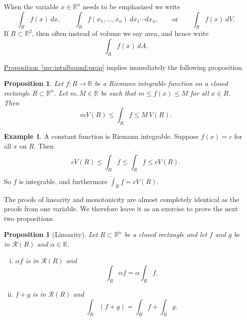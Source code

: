 \documentclass[12pt]{book}
\newcommand{\R}{{\mathbb{R}}}
\newcommand{\sR}{{\mathcal{R}}}
\theoremstyle{plain}
\newtheorem{prop}[thm]{Proposition}
\theoremstyle{remark}
\theoremstyle{definition}
\theoremstyle{exercise}
\theoremstyle{example}
\newtheorem{example}[thm]{Example}
\newcommand{\propref}[1]{\hyperref[#1]{Proposition~\ref*{#1}}}
\begin{document}
When the variable $x \in \R^n$ needs to be emphasized we write
\begin{equation*}
\int_R f(x)~dx,
\qquad
\int_R f(x_1,\ldots,x_n)~dx_1 \cdots dx_n,
\qquad
\text{or}
\qquad
\int_R f(x)~dV .
\end{equation*}
If $R \subset \R^2$, then often instead of volume we say area, and hence
write
\begin{equation*}
\int_R f(x)~dA .
\end{equation*}

\propref{mv:intulbound:prop} implies immediately the following
proposition.

\begin{prop} \label{mv:intbound:prop}
Let $f \colon R \to \R$ be a Riemann integrable function
on a closed rectangle $R \subset \R^n$.
Let $m, M \in \R$ be 
such that $m \leq f(x) \leq M$ for all $x \in R$.  Then
\begin{equation*}
m V(R) \leq
\int_{R} f
\leq M \, V(R) .
\end{equation*}
\end{prop}

\begin{example}
A constant function is Riemann integrable.  Suppose
$f(x) = c$ for all $x$ on $R$.  Then
\begin{equation*}
c V(R) \leq \underline{\int_R} f \leq \overline{\int_R} f \leq cV(R) .
\end{equation*}
So $f$ is integrable, and furthermore $\int_R f = cV(R)$.
\end{example}

The proofs of linearity and monotonicity are almost completely identical as
the proofs from one variable.  We therefore leave it as an exercise to prove
the next two propositions.

\begin{prop}[Linearity] \label{mv:intlinearity:prop}
Let $R \subset \R^n$ be a closed rectangle and let
$f$ and $g$ be in $\sR(R)$ and $\alpha \in \R$.
\begin{enumerate}[(i)]
\item $\alpha f$ is in $\sR(R)$ and
\begin{equation*}
\int_R \alpha f = \alpha \int_R f .
\end{equation*}
\item $f+g$ is in $\sR(R)$ and
\begin{equation*}
\int_R (f+g) = 
\int_R f
+
\int_R g .
\end{equation*}
\end{enumerate}
\end{prop}
\end{document}
